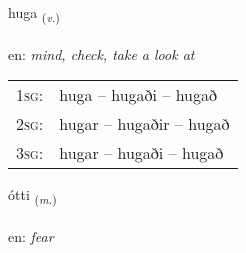 \documentclass[frontgrid, backgrid]{flacards}\usepackage[]{graphicx}\usepackage[]{color}
\begin{document}
\renewcommand{\flhead}{\vskip5pt \fboxsep=0pt {\small\bfseries\footnotesize Sagnorð | Verb}}
\renewcommand{\fcfoot}{\vskip5pt \fboxsep=0pt \hspace{2pt}{\small\bfseries\footnotesize 2K}}

\renewcommand{\blhead}{\vskip5pt {\small\bfseries\footnotesize Sagnorð | Verb }}
\renewcommand{\bcfoot}{\vskip5pt \hspace{2pt}{\small\bfseries\footnotesize 2K}}


{huga \small{\textsubscript{(\textit{v.})}} \\[1ex] %
\textphonetic{[hʏːɣa]} \\
en: \emph{mind, check, take a look at} \\  [2ex]
\renewcommand*{\arraystretch}{0.8}
\begin{tabular}{p{1cm}l}
\textsc{1sg}: & huga -- hugaði -- hugað \\ 
\textsc{2sg}: & hugar -- hugaðir -- hugað \\ 
\textsc{3sg}: & hugar -- hugaði -- hugað \\ 
\end{tabular}
}

\renewcommand{\flhead}{\vskip5pt \fboxsep=0pt {\small\bfseries\footnotesize Nafnorð | Noun}}
\renewcommand{\fcfoot}{\vskip5pt \fboxsep=0pt \hspace{2pt}{\small\bfseries\footnotesize 2K}}

\renewcommand{\blhead}{\vskip5pt {\small\bfseries\footnotesize Nafnorð | Noun }}
\renewcommand{\bcfoot}{\vskip5pt \hspace{2pt}{\small\bfseries\footnotesize 2K}}


{ótti \small{\textsubscript{(\textit{m.})}} \\[1ex] %
\textphonetic{[ouhtɪ]} \\
en: \emph{fear} \\  [2ex]
\renewcommand*{\arraystretch}{0.8}
}
\end{document}
